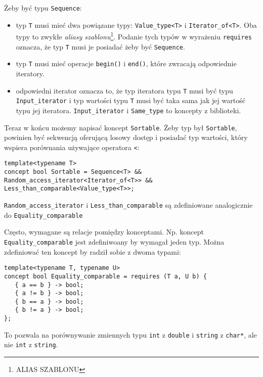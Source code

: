 \documentclass[11pt, a4paper]{article}
\begin{document}
Żeby być typu \verb#Sequence#:

\begin{itemize}

\item typ \verb#T# musi mieć dwa powiązane typy: \verb#Value_type<T># i \verb#Iterator_of<T>#. Oba typy to zwykłe \emph{aliasy szablonu}\footnote{ALIAS SZABLONU}. Podanie tych typów w wyrażeniu \verb#requires# oznacza, że typ \verb#T# musi je posiadać żeby być \verb#Sequence#.

\item typ \verb#T# musi mieć operacje \verb#begin()# i \verb#end()#, które zwracają odpowiednie iteratory.

\item odpowiedni iterator oznacza to, że typ iteratora typu \verb#T# musi być typu \verb#Input_iterator# i typ wartości typu \verb#T# musi być taka sama jak jej wartość typu jej iteratora. \verb#Input_iterator# i \verb#Same_type# to koncepty z biblioteki.

\end{itemize}

Teraz w końcu możemy napisać koncept \verb#Sortable#. Żeby typ był \verb#Sortable#, powinien być sekwencją oferującą losowy dostęp i posiadać typ wartości, który wspiera porównania używające operatora \verb#<#:

\begin{lstlisting}[frame=single]
template<typename T>
concept bool Sortable = Sequence<T> &&
Random_access_iterator<Iterator_of<T>> &&
Less_than_comparable<Value_type<T>>;
\end{lstlisting}

\verb#Random_access_iterator# i \verb#Less_than_comparable# są zdefiniowane analogicznie do \verb#Equality_comparable#

Często, wymagane są relacje pomiędzy konceptami. Np. koncept \verb#Equality_comparable# jest zdefiniwoany by wymagał jeden typ. Można zdefiniować ten koncept by radził sobie z dwoma typami:

\begin{lstlisting}[frame=single]
template<typename T, typename U>
concept bool Equality_comparable = requires (T a, U b) {
   { a == b } -> bool;
   { a != b } -> bool;
   { b == a } -> bool;
   { b != a } -> bool;
};
\end{lstlisting}

To pozwala na porównywanie zmiennych typu \verb#int# z \verb#double# i \verb#string# z \verb#char*#, ale nie \verb#int# z \verb#string#.
\end{document}
